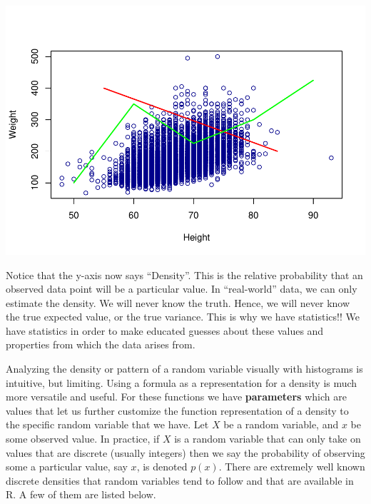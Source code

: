 \documentclass[
]{book}
\newenvironment{Shaded}{\begin{snugshade}}{\end{snugshade}}
\newcommand{\DataTypeTok}[1]{\textcolor[rgb]{0.13,0.29,0.53}{#1}}
\newcommand{\DecValTok}[1]{\textcolor[rgb]{0.00,0.00,0.81}{#1}}
\newcommand{\FloatTok}[1]{\textcolor[rgb]{0.00,0.00,0.81}{#1}}
\newcommand{\KeywordTok}[1]{\textcolor[rgb]{0.13,0.29,0.53}{\textbf{#1}}}
\newcommand{\NormalTok}[1]{#1}
\newcommand{\OperatorTok}[1]{\textcolor[rgb]{0.81,0.36,0.00}{\textbf{#1}}}
\newcommand{\OtherTok}[1]{\textcolor[rgb]{0.56,0.35,0.01}{#1}}
\newcommand{\StringTok}[1]{\textcolor[rgb]{0.31,0.60,0.02}{#1}}
\begin{document}
\begin{Shaded}
\end{Shaded}

\includegraphics{_main_files/figure-latex/unnamed-chunk-214-1.pdf}

Notice that the y-axis now says ``Density''. This is the relative probability that an observed data point will be a particular value. In ``real-world'' data, we can only estimate the density. We will never know the truth. Hence, we will never know the true expected value, or the true variance. This is why we have statistics!! We have statistics in order to make educated guesses about these values and properties from which the data arises from.

Analyzing the density or pattern of a random variable visually with histograms is intuitive, but limiting. Using a formula as a representation for a density is much more versatile and useful. For these functions we have \textbf{parameters} which are values that let us further customize the function representation of a density to the specific random variable that we have. Let \(X\) be a random variable, and \(x\) be some observed value. In practice, if \(X\) is a random variable that can only take on values that are discrete (usually integers) then we say the probability of observing some a particular value, say \(x\), is denoted \(p(x)\). There are extremely well known discrete densities that random variables tend to follow and that are available in R. A few of them are listed below.
\end{document}
